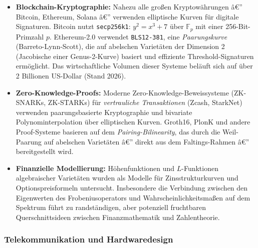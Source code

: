 ﻿\documentclass[12pt,a4paper]{article}
\theoremstyle{plain}
\theoremstyle{definition}
\theoremstyle{remark}
\newcommand{\F}{\mathbb{F}}
\begin{document}
\begin{itemize}[leftmargin=2em,itemsep=4pt]
  \item \textbf{Blockchain-Kryptographie:}
    Nahezu alle großen Kryptowährungen â€” Bitcoin, Ethereum, Solana â€”
    verwenden elliptische Kurven für digitale Signaturen.
    Bitcoin nutzt \texttt{secp256k1}: $y^2 = x^3 + 7$ über $\F_p$ mit einer
    256-Bit-Primzahl $p$. Ethereum-2.0 verwendet \texttt{BLS12-381}, eine
    \emph{Paarungskurve} (Barreto-Lynn-Scott), die auf abelschen Varietäten
    der Dimension 2 (Jacobische einer Genus-2-Kurve) basiert und effiziente
    Threshold-Signaturen ermöglicht. Das wirtschaftliche Volumen dieser Systeme
    beläuft sich auf über 2 Billionen US-Dollar (Stand 2026).

  \item \textbf{Zero-Knowledge-Proofs:}
    Moderne Zero-Knowledge-Beweissysteme (ZK-SNARKs, ZK-STARKs) für
    \emph{vertrauliche Transaktionen} (Zcash, StarkNet) verwenden
    paarungsbasierte Kryptographie und bivariate Polynominterpolation
    über elliptischen Kurven. Groth16, PlonK und andere Proof-Systeme
    basieren auf dem \emph{Pairing-Bilinearity}, das durch die Weil-Paarung
    auf abelschen Varietäten â€” direkt aus dem Faltings-Rahmen â€” bereitgestellt wird.

  \item \textbf{Finanzielle Modellierung:}
    Höhenfunktionen und $L$-Funktionen algebraischer Varietäten wurden als
    Modelle für Zinsstrukturkurven und Optionspreisformeln untersucht.
    Insbesondere die Verbindung zwischen den Eigenwerten des Frobeniusoperators
    und Wahrscheinlichkeitsmaßen auf dem Spektrum führt zu randständigen,
    aber potenziell fruchtbaren Querschnittsideen zwischen Finanzmathematik
    und Zahlentheorie.
\end{itemize}

\subsubsection{Telekommunikation und Hardwaredesign}
\end{document}

